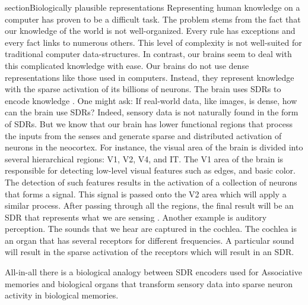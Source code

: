 section{Biologically plausible representations}
Representing human knowledge on a computer has proven to be a difficult task. The problem stems from the fact that our knowledge of the world is not well-organized. Every rule has exceptions and every fact links to numerous others. This level of complexity is not well-suited for traditional computer data-structures. In contrast, our brains seem to deal with this complicated knowledge with ease. Our brains do not use dense representations like those used in computers. Instead, they represent knowledge with the sparse activation of its billions of neurons. The brain uses SDRs to encode knowledge \cite{Hawkins-et-al-2016-Book}. One might ask: If real-world data, like images, is dense, how can the brain use SDRs? Indeed, sensory data is not naturally found in the form of SDRs. But we know that our brain has lower functional regions that process the inputs from the senses and generate sparse and distributed activation of neurons in the neocortex. For instance, the visual area of the brain is divided into several hierarchical regions: V1, V2, V4, and IT. The V1 area of the brain is responsible for detecting low-level visual features such as edges, and basic color. The detection of such features results in the activation of a collection of neurons that forms a signal. This signal is passed onto the V2 area which will apply a similar process. After passing through all the regions, the final result will be an SDR that represents what we are sensing \cite{hawkins2004intelligence}. Another example is auditory perception. The sounds that we hear are captured in the cochlea. The cochlea is an organ that has several receptors for different frequencies. A particular sound will result in the sparse activation of the receptors which will result in an SDR.

All-in-all there is a biological analogy between SDR encoders used for Associative memories and biological organs that transform sensory data into sparse neuron activity in biological memories.